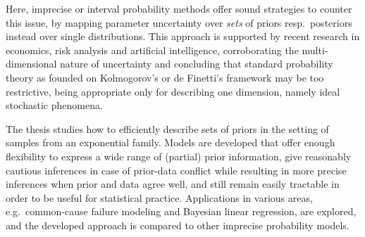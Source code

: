 Here, imprecise or interval probability methods offer sound strategies to counter this issue,
by mapping parameter uncertainty over \emph{sets} of priors resp.\ posteriors instead over single distributions.
This approach is supported by recent research in economics, risk analysis and artificial intelligence,
corroborating the multi-dimensional nature of uncertainty and concluding that standard probability theory
as founded on Kolmogorov's or de Finetti's framework may be too restrictive,
being appropriate only for describing one dimension, namely ideal stochastic phenomena.

The thesis studies how to efficiently describe sets of priors in the setting of samples from an exponential family. 
Models are developed that offer enough flexibility to express a wide range of (partial) prior information,
give reasonably cautious inferences in case of prior-data conflict while resulting in more precise inferences when prior and data agree well,
and still remain easily tractable in order to be useful for statistical practice.
Applications in various areas, e.g.\ common-cause failure modeling and Bayesian linear regression, are explored,
and the developed approach is compared to other imprecise probability models.
